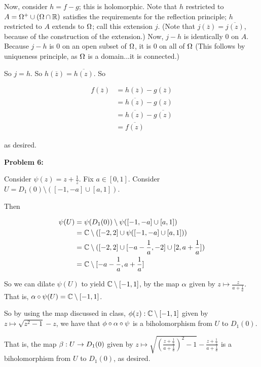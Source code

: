 \documentclass[a4paper,12pt]{article}
\begin{document}
Now, consider $h=f-g$; this is holomorphic. Note that $h$ restricted to $A=\Omega^+ \cup (\Omega \cap \mathbb{R})$ satisfies the requirements for the reflection principle; $h$ restricted to $A$ extends to $\Omega$; call this extension $j$. (Note that $j(\overline{z}) = \overline{j(z)}$, because of the construction of the extension.) Now, $j-h$ is identically $0$ on $A$. Because $j-h$ is $0$ on an open subset of $\Omega$, it is $0$ on all of $\Omega$ (This follows by uniqueness principle, as $\Omega$ is a domain...it is connected.)

So $j=h$. So $h(\overline{z}) = \overline{h(z)}$. So 

\begin{align*}
f(\overline{z}) &= h(\overline{z}) - g(\overline{z})\\
&= \overline{h(z)} - g(z)\\
&= \overline{h(z)} - \overline{g(z)}\\
&= \overline{f(z)}
\end{align*}

as desired.

\shunt

{\bf Problem 6:}

Consider $\psi(z) = z + \frac{1}{z}$. Fix $a \in [0,1]$. Consider $U = D_1(0) \setminus ([-1,-a] \cup [a,1])$.

Then 

\begin{align*}
\psi(U) &= \psi(D_1(0)) \setminus \psi([-1,-a] \cup [a,1])\\
&= \mathbb{C} \setminus ([-2,2] \cup \psi([-1,-a] \cup [a,1]))\\
&= \mathbb{C} \setminus ([-2,2] \cup [-a-\frac{1}{a},-2]\cup [2,a+\frac{1}{a}])\\
&= \mathbb{C} \setminus [-a-\frac{1}{a},a+\frac{1}{a}]
\end{align*}

So we can dilate $\psi(U)$ to yield $\mathbb{C} \setminus [-1,1]$, by the map $\alpha$ given by $z \mapsto \frac{z}{a+\frac{1}{a}}$. That is, $\alpha \circ \psi (U) = \mathbb{C} \setminus [-1,1]$.

So by using the map discussed in class, $\phi(z): \mathbb{C} \setminus [-1,1]$ given by $z \mapsto \sqrt{z^2-1} -z$, we have that $\phi \circ \alpha \circ \psi$ is a biholomorphism from $U$ to $D_1(0)$.

That is, the map $\beta: U \to D_1(0)$ given by $z \mapsto \sqrt{(\frac{z + \frac{1}{z}}{a+\frac{1}{a}})^2 - 1} - \frac{z + \frac{1}{z}}{a+\frac{1}{a}}$ is a biholomorphism from $U$ to $D_1(0)$, as desired.

\shunt
\end{document}

